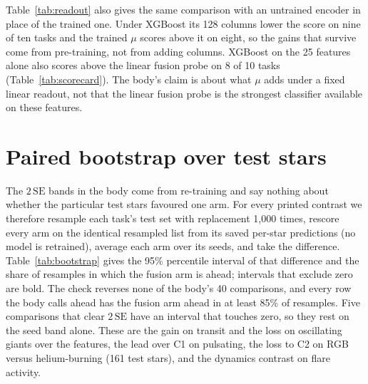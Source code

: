 \documentclass{article}
\begin{document}
Table~\ref{tab:readout} also gives the same comparison with an untrained encoder in place of the
trained one. Under XGBoost its 128 columns lower the score on nine of ten tasks and the trained $\mu$
scores above it on eight, so the gains that survive come from pre-training, not from adding columns.
XGBoost on the 25 features alone also scores above the linear fusion probe on 8 of 10 tasks
(Table~\ref{tab:scorecard}). The body's claim is about what $\mu$ adds under a fixed linear readout,
not that the linear fusion probe is the strongest classifier available on these features.

\section{Paired bootstrap over test stars}
\label{app:bootstrap}

The $2\,\mathrm{SE}$ bands in the body come from re-training and say nothing about whether the
particular test stars favoured one arm. For every printed contrast we therefore resample each task's
test set with replacement 1{,}000 times, rescore every arm on the identical resampled list from its
saved per-star predictions (no model is retrained), average each arm over its seeds, and take the
difference. Table~\ref{tab:bootstrap} gives the 95\% percentile interval of that difference and the
share of resamples in which the fusion arm is ahead; intervals that exclude zero are bold. The check
reverses none of the body's 40 comparisons, and every row the body calls ahead has the fusion arm
ahead in at least 85\% of resamples. Five comparisons that clear $2\,\mathrm{SE}$ have an interval
that touches zero, so they rest on the seed band alone. These are the gain on transit and the loss on
oscillating giants over the features, the lead over C1 on pulsating, the loss to C2 on RGB versus
helium-burning (161 test stars), and the dynamics contrast on flare activity.

\begin{table}[H]
\caption{Paired star-bootstrap of the four contrasts the body counts. Each entry is the 95\% interval
of (left arm $-$ right arm) over 1{,}000 resamples of the test stars, seeds averaged, and the share of
resamples with the difference above zero ($f_{>0}$; 1.00 means the left arm is ahead in every
resample, 0.00 that it is behind in every resample). Bold: interval excludes zero.}
\label{tab:bootstrap}
\centering
\scriptsize
\setlength{\tabcolsep}{2pt}

\end{table}
\end{document}
